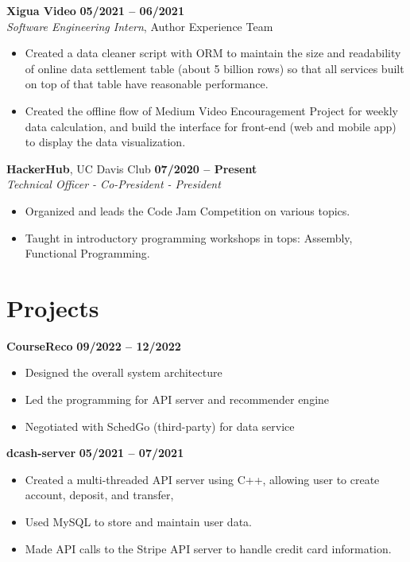 \documentclass[margin,line]{res}
\begin{document}
\begin{resume}
{\bf Xigua Video} \hfill {\bf 05/2021 -- 06/2021} \\
\textit{Software Engineering Intern}, {Author Experience Team}
\begin{itemize}
	\item Created a data cleaner script with ORM to maintain the size and readability of online data settlement table (about 5 billion rows) so that all services built on top of that table have reasonable performance.
	\item Created the offline flow of Medium Video Encouragement Project for weekly data calculation, and build the interface for front-end (web and mobile app) to display the data visualization.
\end{itemize}
\vspace{-.3cm}

{\bf HackerHub}, UC Davis Club \hfill {\bf 07/2020 -- Present} \\
\textit{Technical Officer - Co-President - President}
\begin{itemize}
	\item Organized and leads the Code Jam Competition on various topics.
	\item Taught in introductory programming workshops in tops: Assembly, Functional Programming.
\end{itemize}
\vspace{-.3cm}

\section{\sc Projects}
{\bf CourseReco} \hfill {\bf 09/2022 -- 12/2022 } \\
\begin{itemize}
	\item Designed the overall system architecture
	\item Led the programming for API server and recommender engine
	\item Negotiated with SchedGo (third-party) for data service
\end{itemize}
\vspace{-.3cm}

{\bf dcash-server} \hfill {\bf 05/2021 -- 07/2021} \\
\begin{itemize}
	\item Created a multi-threaded API server using C++, allowing user to create account, deposit, and transfer,
	\item Used MySQL to store and maintain user data.
	\item Made API calls to the Stripe API server to handle credit card information.
\end{itemize}
\vspace{-.3cm}



\end{resume}
\end{document}
